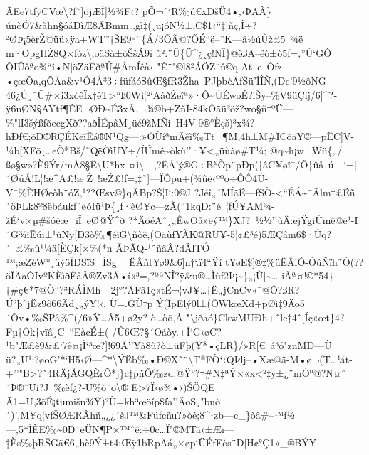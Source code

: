 ÃEe7tfÿCVœ\textbackslash?f˜{]}öjÆÌ{]}½ ¾F‹?
pÕ¬ˆ`R‰ú€xDšÜ4•‚‹ÞAÀ\}únòÓ7\&àhn§óáDìÆ8ÂBmm\ldots gì‡(¸u¡óN½±‚C\$1‹``‡¦ñç‚Î÷?²ØÞ¡5èrŽ@üü«ÿa+WT''†ŠE9º''\{Á/3ÕÃ@?ÕÉ``ë--''K---â½úÙž£5~¾ë
m·O þgHŽ8Q×fóz\textbackslash‚oäSå±òŠšÁ9ï
ù².¨Û\{Ü\^{}¿¸ç!NÎ\}@êßA--ëò±ò5ƒ=‚''Ú`GÔ
ÕIÛôªo¾``î•N{[}öZäËðªÛ\#ÅmÍêà‹-"Ê¨"©l8\textquotesingle²ÁÖZ¨û©q-At~e~Ôfz
•çœÕa‚qÕÄa\&v¹Ó4Å³3÷füƒáóSûŒ§fR3Žha~PJþbèÄfŠü'ÍÎÑ‚(Dc'9½ôNG
46¿Ù¸¯Û\#×i3xòêÏx†êT\textgreater``ß0Wì¦²`AàðŽeîª»·Ô\textasciitilde ÚÉwoÉ?iŠy--\%V9üÇij/6{]}\^{}?­ÿ6nØN§AŸtf¶ÊË¬ØÐ\textasciitilde É3xÃ‚¬¾©b+ZñÏ-84kÔãü²öž?wo§ñ‡ºÜ---\%"lI3šýßƒõecgXð??aðÎÉpâM¸üé9žMÑi--H4V¦9®°Èçš)³x¾?hÐƒ€;õD®RÇÉKëîÊá®N¹Qg---:»ÔÙíªmÂêì‰Tt\_¶M,4h±M\#ÏCõäY©---pËC{]}V-¼b{[}XFõ¸\ldots eÒ*Bš/˜QëÒìUÝ÷/ÍÚmê\textasciitilde òkù''·¥\textless„üùàø\#T¼\textquotesingle;
@q\textasciitilde h¡\textquotesingle w·Wü\{„/ßø§wø?È9Ýr/mÃ8§Ë\textbackslash U* hx
¤i\textbackslash---,?ËÂ'ý®G÷BèÒp¨pÐp(‡âC¥øî¯/Õ\}ûå‡ú---` ±{]}´ØúÁ!L\textquotesingle¦!æ\^{}A£!æ¦Ž~!æŽ£!f=,‡˜{]}---ÏÔ­pu+(¾ûë‹ººo÷ÔÔ4Ú-
V¯\%ÈHØeòh¨óZ‚¹??Œsv©\}qÂBp?Š¦I`:0©J
?Jéî„´MÍãË---fSÒ-\textless``ÉÁ\textasciitilde¯Ãlm‡£Ëñ´öÞLk8º8ëbáukf¨øóIü¹Þ\{¸f·èØ¥c---zÃ(``1kqD:¨é~¦ƒÚ¥AM\textbar¾-žÉ`v×µ\#šóëœ\_iÎ¯eØ@Ÿ\^{}ð­
?*ÄöéAˆ¸„ÊwOå»ëý™\}XJ?¯½½''ùÄ:ejŸgiÙmê@ë¹-I´G¾ïËúi±¹ùNy{[}D3ò‰¶éïG\textbackslash ñòê‚(Oäùƒ\textbar*ŸÀK@RÜ¥-5¦¢£³é)5ÆÇâm6\$·Ûq?´~£‰û¹¼ä{[}ÈÇk{[}­×\%(*n
ÃÞÃQ-¹ˆñâÂ?dÂlTÓ ™;æZèW°¸üýöÎDSïS\_ÍSg\_~ËÂñtYø9\&6{]}n†`.ï4``Ÿí
tYøE\${]}®‡\%üËÂiÔ-ÒûÑïh˜Ó(??öÏÄaÔIvºKÈìðËåÅ®Zv3Ã•í«³=,?ªªNÎ?ÿ\&u®\ldots Ìùƒ2Þ¡\textasciitilde\}„¡Ù{[}\textasciitilde\ldots-iÃª¤!©*54\}†\#ç€*7@Ò``?³RÁÌMh---2j°?ÄFâ1ç«tÉ¬¦vJ¥\ldots†Ë„jCnCv«¯@Ô?ßR?Ú²þˆjËz9ô66Äd¸„ýY!‹,
Ù=.GÙ†p
Ý(ÏpElý0l±(ÔWkœXd+pØì‡9Äo5´Õv•‰ŠPå\%\^{}(/6»Ÿ\ldotsÂ5+ø2y?-ò\ldots òõ,Â
\textquotesingle"\textbackslash jðaó\}CkwM­UÐh+ˆle‡4ˆ{[}Íç«œt\}4?Fµ†Ôk†vïâ¸C~``Eà\textquotesingle¢É±(
/Û 6Œ?§´Oáòy.+Í`G‹øC?¹b"Æ£è9\&£`7ê¤¡Ì`³œ?{]}!69Ä''Yà8ù?ò±üFþ(Ÿ*•çLR\}/»R{[}€¯á³ó"znMD---Ù
ü?\textbar„U¹:?øoG'*`H5‹Ø---­\^{}*\textbackslashÝËb‰•Ð©Xˆ¨\textbackslash T*FÒ`‹QÞlj--•Xæ@ä-M•ø¬(T\ldots¼t-+''"B\textgreater?˜4RÄj\textquotesingleÅGQÈrÕ*j\}c‡­pñÕ‰zd:@Ÿ°?†\#N‡ªÝ×«x\textless²‡y±¿¨mÓ°@?N¤ˆ´Þ®ˆUi?J~‰èƒ¿?­-U\%ò¨ö\textbackslash®
E\textgreater7Ï‹ø¾•›)ŠÖQE
Ã1=U,3õÉ¡tumišn¾Ÿ)²Ù=kh³œöíp\$fa''ÃoS¸"buò´)',M¥q¦vfŠØÆRÂhñ„¿¿´šJ™\&Füƒcñu?»òé;8\^{}¹zb---c\_\}ò â\#--™f½---,5*ÍÈE‰\textasciitilde0D¨ëÜN¶P×™ˆê:÷0c\ldots Ï"©MTá‹±Æï---‡Ès‰þRŠGã€6„hè9Ý±t4:Œÿ1bRpÄá„×øp`ÜÉƒEòs¨D{]}H¢°Ç1»\_®BÝY
